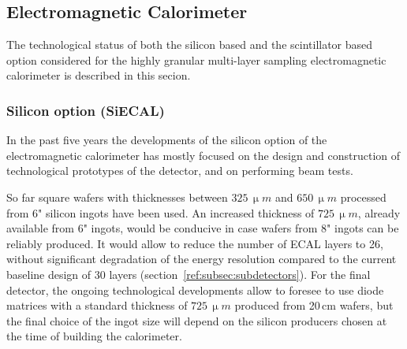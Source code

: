\subsection{Electromagnetic Calorimeter}
\label{ild:sec:ECAL}
The technological status of both the silicon based and the scintillator based option considered for the highly granular multi-layer sampling electromagnetic calorimeter is described in this secion. 

\subsubsection{Silicon option (SiECAL)}

In the past five years the developments of the silicon option of the electromagnetic calorimeter has mostly focused on the design and construction of technological prototypes of the detector, and on performing beam tests. 

So far square wafers with thicknesses between $325\,\upmu m$ and $650\,\upmu m$ processed from 6" silicon ingots have been used. 
An increased thickness of $725\,\upmu m$, already available from 6" ingots, would be conducive in case wafers from 8" ingots can be reliably produced. It would allow to reduce the number of ECAL layers to 26, without significant degradation of the energy resolution compared to the current baseline design of 30 layers (section~\ref{ref:subsec:subdetectors}). For the final detector, the ongoing technological developments allow to foresee to use diode matrices with a standard thickness of $725\,\upmu m$ produced from 20\,cm wafers, but the final choice of the ingot size will depend on the silicon producers chosen at the time of building the calorimeter.



